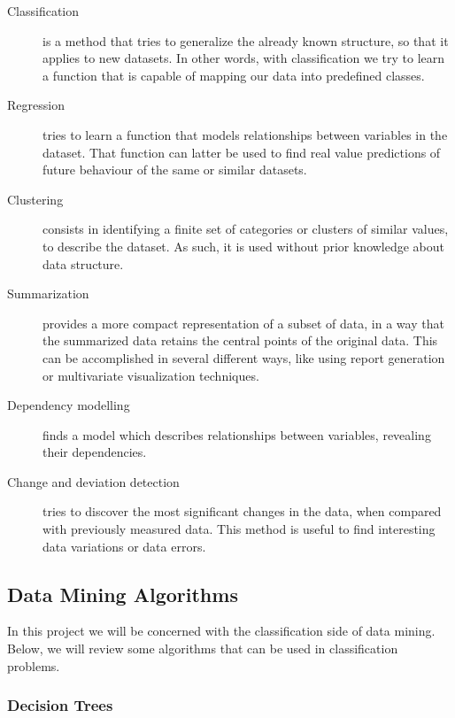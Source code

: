 \begin{description}

  \item[Classification]
  is a method that tries to generalize the already known structure, so that it
  applies to new datasets. In other words, with classification we try to learn a
  function that is capable of mapping our data into predefined classes.

  \item[Regression]
  tries to learn a function that models relationships between variables in the
  dataset. That function can latter be used to find real value predictions of
  future behaviour of the same or similar datasets.

  \item[Clustering]
  consists in identifying a finite set of categories or clusters of similar
  values, to describe the dataset. As such, it is used without prior knowledge
  about data structure.

  \item[Summarization]
  provides a more compact representation of a subset of data, in a way that the
  summarized data retains the central points of the original data. This can be
  accomplished in several different ways, like using report generation or
  multivariate visualization techniques.

  \item[Dependency modelling]
  finds a model which describes relationships between variables, revealing their
  dependencies.

  \item[Change and deviation detection]
  tries to discover the most significant changes in the data, when compared with
  previously measured data. This method is useful to find interesting data
  variations or data errors.

\end{description}

\subsection{Data Mining Algorithms}\label{sec:minalgo}

In this project we will be concerned with the classification side of data
mining. Below, we will review some algorithms that can be used in
classification problems.

\subsubsection*{Decision Trees}

